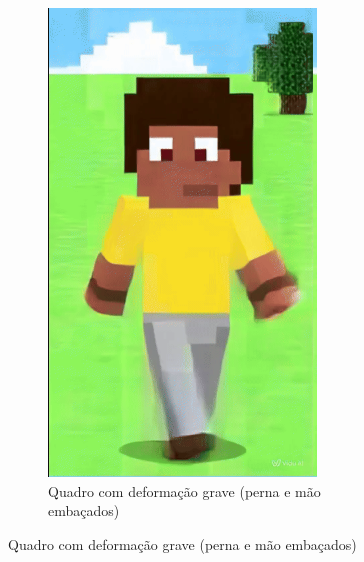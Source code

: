\begin{figure}[htbp]
\begin{subfigure}{0.32\linewidth}
        \includegraphics[width=0.8\linewidth]{figs/vidu/1grave.png}
        \caption{\small Quadro com deformação grave (perna e mão embaçados)}
        \label{fig:viduDeformacao1Grave}
    \end{subfigure}
\end{figure}


